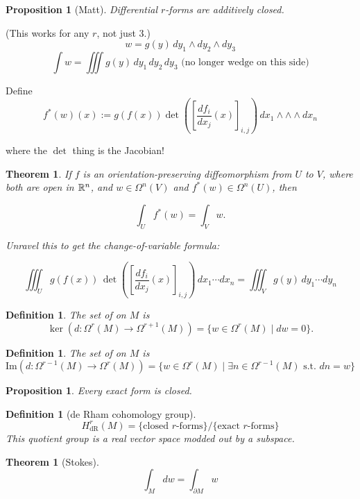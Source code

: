 \documentclass[11pt]{amsbook}
\theoremstyle{mystyle} \newtheorem{thrm}[thm]{Theorem}
\theoremstyle{mystyle} \newtheorem{defi}[thm]{Definition}
\theoremstyle{mystyle} \newtheorem{coro}[thm]{Corollary}
\theoremstyle{mystyle} \newtheorem{propo}[thm]{Proposition}
\theoremstyle{mystyle} \newtheorem{lemm}[thm]{Lemma}
\numberwithin{thm}{section}
\begin{document}
\begin{propo}[Matt]
	Differential $r$-forms are additively closed.
\end{propo}

\begin{example}[integration]	%
	(This works for any $r$, not just 3.)
	$$w = g(y) \,dy_1  \wedge  dy_2  \wedge  dy_3$$	%
	$$\int w = \iiint g(y) \,dy_1 \,dy_2 \,dy_3 \text{ (no longer wedge on this side)}$$	%

	Define
	$$f^*(w)(x) := g(f(x)) \det\left(\left[\frac{df_i}{dx_j}(x)\right]_{i,j}\right) \,dx_1  \wedge  \wedge  \wedge  dx_n$$

	where the $\det$ thing is the Jacobian!
\end{example}

\begin{thrm}
	If $f$ is an orientation-preserving diffeomorphism from $U$ to $V$, where both are open in ${\mathbb R}^n$,
	and $w \in \Omega^n(V)$ and
	$f^*(w) \in \Omega^n(U)$,
	then

	$$\int_U f^*(w) = \int_V w.$$

	Unravel this to get the change-of-variable formula:

	$$\iiint_U g(f(x)) \,\det\left(\left[\frac{df_i}{dx_j}(x)\right]_{i,j}\right) \,dx_1 \cdots dx_n = \iiint_V g(y) \,dy_1 \cdots dy_n$$
\end{thrm}

\begin{defi}
	The set of  on $M$ is $$ \ker(d: \Omega^r(M) \to \Omega^{r+1}(M) ) = \{ w \in \Omega^r(M) \mid dw = 0 \}.  $$
\end{defi}

\begin{defi}
	The set of  on $M$ is $$ \text{Im}(d: \Omega^{r-1}(M) \to \Omega^r(M) ) = \{ w \in \Omega^r(M) \mid \exists n \in \Omega^{r-1}(M) \text{ s.t. } dn = w \}  $$
\end{defi}

\begin{propo}
	Every exact form is closed.
\end{propo}

\begin{defi}[de Rham cohomology group]
	$$H^r_\text{dR}(M) = \text{\{closed $r$-forms\}/\{exact $r$-forms\}}$$ %
	This quotient group is a real vector space modded out by a subspace.
\end{defi}

\begin{thrm}[Stokes]
	$$\int_M dw = \int_{\partial M} w$$
\end{thrm}
\end{document}
